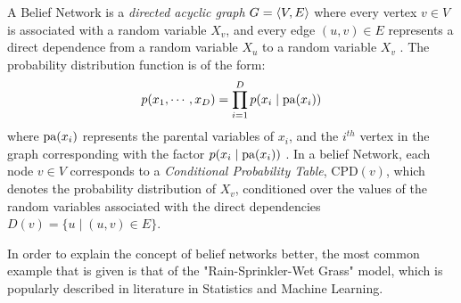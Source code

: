 \begin{frm-def}
\textup{A Belief Network is a \emph{directed acyclic graph} $G = \braket{V,E}$ where every vertex $v \in V$ is associated with a random variable $X_v$, and every edge $(u,v) \in E$ represents a direct dependence from a random variable $X_u$ to a random variable $X_v$ \cite{Gordon-2014}. The probability distribution function is of the form\cite{barberBRML2011}:}
\vspace{-3mm}
\begin{gather*}
p(x_1, \cdots, x_D) = \prod_{i=1}^{D} p(x_i \mid \textup{pa} (x_i))
\end{gather*}
\textup{where $\textup{pa}(x_i)$ represents the parental variables of $x_i$, and the $i^{th}$ vertex in the graph corresponding with the factor $p(x_i \mid \textup{pa} (x_i))$ \footnotemark. In a belief Network, each node $v \in V$ corresponds to a \emph{Conditional Probability Table}, \textsf{CPD}$(v)$, which denotes the probability distribution of $X_v$, conditioned over the values of the random variables associated with the direct dependencies $D(v) = \{u \mid (u,v) \in E\}$.}

\end{frm-def}


\vspace{-3mm}

In order to explain the concept of belief networks better, the most common example that is given is that of the "Rain-Sprinkler-Wet Grass" model, which is popularly described in literature in Statistics and Machine Learning.

\vspace{3mm}

